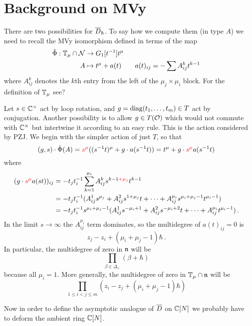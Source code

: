 \documentclass[11pt]{article}
\begin{document}
\section*{Background on MVy}
% 
There are two possibilities for $\overline{D}_\hbar$. To say how we compute them (in type $A$) we need to recall the MVy isomorphism defined in terms of the map 
\begin{equation}
    \begin{split}
        \tilde\Phi : \mathbb T_\mu\cap\mathcal N &\to G_1[t^{-1}]t^\mu \\
        A &\mapsto t^\mu + a(t) \qquad a(t)_{ij} = -\sum A_{ij}^k t^{k-1}
    \end{split}
\end{equation}
where $A_{ij}^k$ denotes the $k$th entry from the left of the $\mu_j\times\mu_i$ block. For the definition of $\mathbb T_\mu$ see?

Let $s\in\mathbb C^\times$ act by loop rotation, and $g = \operatorname{diag}(t_1,\dots,t_m)\in T$ act by conjugation. Another possibility is to allow $g\in T(\mathcal O)$ which would not commute with $\mathbb C^\times$ but intertwine it according to an easy rule. This is the action considered by PZJ. 
We begin with the simpler action of just $T$, so that
$$
(g,s) \cdot \tilde\Phi(A) = {\color{red} s^{\mu}}((s^{-1}t)^\mu + g\cdot a(s^{-1}t)) = t^\mu + g\cdot {\color{red} s^{\mu}} a(s^{-1}t) 
$$
where 
$$
\begin{aligned}
(g\cdot {\color{red} s^{\mu}}a(st))_{ij} &= - t_jt_i^{-1}\sum_{k=1}^{\mu_i} A_{ij}^k s^{k-1{\color{red}+\mu_j}}t^{k-1} \\
&= -t_jt_i^{-1}(A_{ij}^1 s^{\mu_j} + A_{ij}^2 s^{1 + \mu_j}t + \cdots + A_{ij}^{\mu_i}s^{\mu_i + \mu_j - 1}t^{\mu_i - 1}) \\
&= -t_jt_i^{-1}s^{\mu_i + \mu_j - 1}(A_{ij}^1 s^{-\mu_i + 1} + A_{ij}^2 s^{-\mu_i + 2}t + \cdots + A_{ij}^{\mu_i}t^{\mu_i - 1})\,.
\end{aligned}
$$
In the limit $s\to \infty$ the $A_{ij}^{\mu_i}$ term dominates, so the multidegree of $a(t)_{ij}=0$ is 
$$z_j - z_i + (\mu_i + \mu_j - 1)\hbar\,.$$
In particular, the multidegree of zero in $\mathfrak n$ will be 
$$
\prod_{\beta\in\Delta_+} (\beta + \hbar)
$$
because all $\mu_i = 1$. More generally, the multidegree of zero in $\mathbb T_\mu\cap\mathfrak n$ will be 
$$
\prod_{1\le i<j\le m} (z_i - z_j + (\mu_i + \mu_j - 1)\hbar)
$$

Now in order to define the asymptotic analogue of $\overline{D}$ on $\mathbb C[N]$ we probably have to deform the ambient ring $\mathbb C[N]$. 
\end{document}
